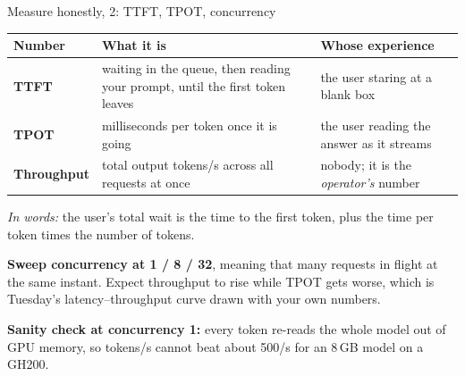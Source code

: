 \documentclass[aspectratio=169,10pt]{beamer}
\begin{document}
\begin{frame}[shrink=12]{Measure honestly, 2: TTFT, TPOT, concurrency}
  \centering
  \small
  \begin{tabular}{@{}L{2.4cm} L{4.1cm} L{4.3cm}@{}}
    \toprule
    \textbf{Number} & \textbf{What it is} & \textbf{Whose experience}\\
    \midrule
    \textbf{TTFT} & waiting in the queue, then reading your prompt, until the
      first token leaves & the user staring at a blank box\\
    \addlinespace[0.3em]
    \textbf{TPOT} & milliseconds per token once it is going &
      the user reading the answer as it streams\\
    \addlinespace[0.3em]
    \textbf{Throughput} & total output tokens/s across all requests at once &
      nobody; it is the \emph{operator's} number\\
    \bottomrule
  \end{tabular}
  \vspace{0.4em}

  \raggedright
  \emph{In words:} the user's total wait is the time to the first token, plus
  the time per token times the number of tokens.
  \vspace{0.3em}

  \textbf{Sweep concurrency at 1 / 8 / 32}, meaning that many requests in
  flight at the same instant. Expect throughput to rise while TPOT gets worse,
  which is Tuesday's latency--throughput curve drawn with your own numbers.
  \vspace{0.2em}

  \small
  \textbf{Sanity check at concurrency 1:} every token re-reads the whole model
  out of GPU memory, so tokens/s cannot beat about 500/s for an 8\,GB model on
  a GH200.
\end{frame}
\end{document}
